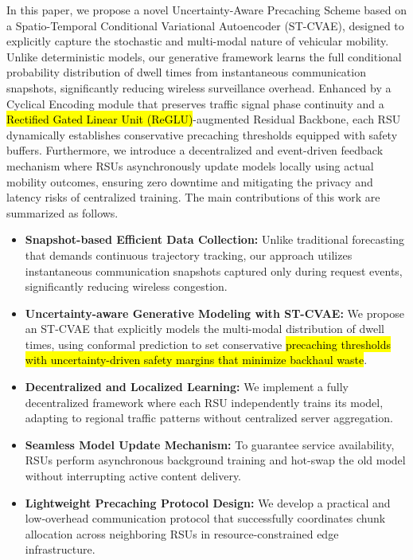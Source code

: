 \documentclass[journal]{IEEEtran}
\begin{document}
\IEEEpubidadjcol
In this paper, we propose a novel Uncertainty-Aware Precaching Scheme based on a Spatio-Temporal Conditional Variational Autoencoder (ST-CVAE), designed to explicitly capture the stochastic and multi-modal nature of vehicular mobility. 
Unlike deterministic models, our generative framework learns the full conditional probability distribution of dwell times from instantaneous communication snapshots, significantly reducing wireless surveillance overhead. 
Enhanced by a Cyclical Encoding module that preserves traffic signal phase continuity and a \hl{Rectified Gated Linear Unit (ReGLU)}-augmented Residual Backbone, each RSU dynamically establishes conservative precaching thresholds equipped with safety buffers. 
Furthermore, we introduce a decentralized and event-driven feedback mechanism where RSUs asynchronously update models locally using actual mobility outcomes, ensuring zero downtime and mitigating the privacy and latency risks of centralized training.
The main contributions of this work are summarized as follows.
\begin{itemize}
    \item \textbf{Snapshot-based Efficient Data Collection:} Unlike traditional forecasting that demands continuous trajectory tracking, our approach utilizes instantaneous communication snapshots captured only during request events, significantly reducing wireless congestion.
    \item \textbf{Uncertainty-aware Generative Modeling with ST-CVAE:} We propose an ST-CVAE that explicitly models the multi-modal distribution of dwell times, using conformal prediction to set conservative \hl{precaching thresholds with uncertainty-driven safety margins that minimize backhaul waste}.
    \item \textbf{Decentralized and Localized Learning:} We implement a fully decentralized framework where each RSU independently trains its model, adapting to regional traffic patterns without centralized server aggregation.
    \item \textbf{Seamless Model Update Mechanism:} To guarantee service availability, RSUs perform asynchronous background training and hot-swap the old model without interrupting active content delivery.
    \item \textbf{Lightweight Precaching Protocol Design:} We develop a practical and low-overhead communication protocol that successfully coordinates chunk allocation across neighboring RSUs in resource-constrained edge infrastructure.
\end{itemize}
\end{document}
